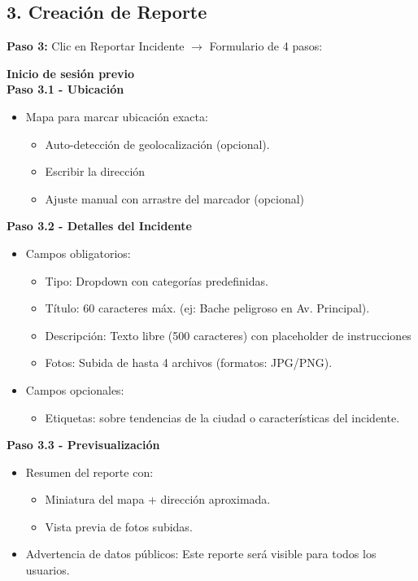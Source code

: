 \begin{multicols}{2}
\section*{3. Creación de Reporte}

\textbf{Paso 3:} Clic en Reportar Incidente $\rightarrow$ Formulario de 4 pasos:

\textbf{Inicio de sesión previo}\\
\textbf{Paso 3.1 - Ubicación}
\begin{itemize}
    \item Mapa para marcar ubicación exacta:
    \begin{itemize}
        \item Auto-detección de geolocalización (opcional).
        \item Escribir la dirección
        \item Ajuste manual con arrastre del marcador (opcional)
    \end{itemize}
\end{itemize}

\textbf{Paso 3.2 - Detalles del Incidente}
\begin{itemize}
    \item Campos obligatorios:
    \begin{itemize}
        \item Tipo: Dropdown con categorías predefinidas.
        \item Título: 60 caracteres máx. (ej: Bache peligroso en Av. Principal).
        \item Descripción: Texto libre (500 caracteres) con placeholder de instrucciones
        \item Fotos: Subida de hasta 4 archivos (formatos: JPG/PNG).
    \end{itemize}
    \item Campos opcionales:
    \begin{itemize}        
        \item Etiquetas: sobre tendencias de la ciudad o características del incidente.
    \end{itemize}
\end{itemize}

\textbf{Paso 3.3 - Previsualización}
\begin{itemize}
    \item Resumen del reporte con:
    \begin{itemize}
        \item Miniatura del mapa + dirección aproximada.
        \item Vista previa de fotos subidas.
    \end{itemize}
    \item Advertencia de datos públicos: Este reporte será visible para todos los usuarios.
\end{itemize}


\end{multicols}
